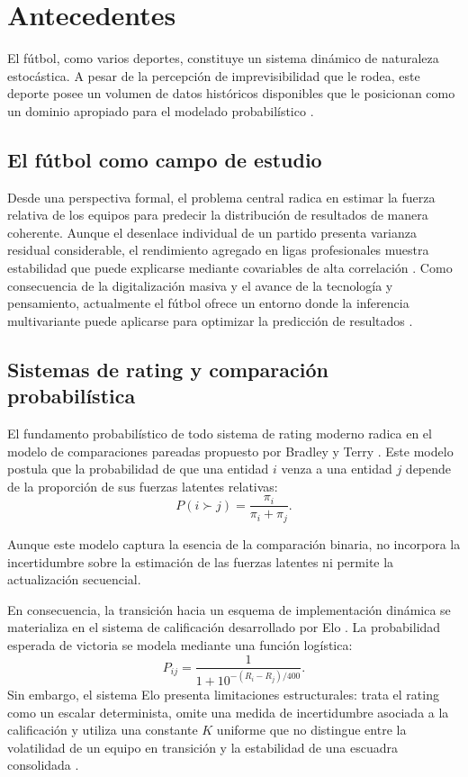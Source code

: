 \chapter{Antecedentes}
\label{ch:antecedentes}

El f\'utbol, como varios deportes, constituye un sistema din\'amico de naturaleza estoc\'astica. A pesar de la percepci\'on de imprevisibilidad que le rodea, este deporte posee un volumen de datos hist\'oricos disponibles que le posicionan como un dominio apropiado para el modelado probabil\'istico \cite{Fonseca}.

\section{El f\'utbol como campo de estudio}

Desde una perspectiva formal, el problema central radica en estimar la fuerza relativa de los equipos para predecir la distribuci\'on de resultados de manera coherente. Aunque el desenlace individual de un partido presenta varianza residual considerable, el rendimiento agregado en ligas profesionales muestra estabilidad que puede explicarse mediante covariables de alta correlaci\'on \cite{SZYMAN1}. Como consecuencia de la digitalizaci\'on masiva y el avance de la tecnolog\'ia y pensamiento, actualmente el f\'utbol ofrece un entorno donde la inferencia multivariante puede aplicarse para optimizar la predicci\'on de resultados \cite{VanPutten2023}.

\section{Sistemas de rating y comparaci\'on probabil\'istica}
\label{sec:sistemas_rating}

El fundamento probabil\'istico de todo sistema de rating moderno radica en el modelo de comparaciones pareadas propuesto por Bradley y Terry \cite{bradley1952}. Este modelo postula que la probabilidad de que una entidad \(i\) venza a una entidad \(j\) depende de la proporci\'on de sus fuerzas latentes relativas:
\[
P(i \succ j) = \frac{\pi_i}{\pi_i + \pi_j}.
\]

Aunque este modelo captura la esencia de la comparaci\'on binaria, no incorpora la incertidumbre sobre la estimaci\'on de las fuerzas latentes ni permite la actualizaci\'on secuencial.

En consecuencia, la transici\'on hacia un esquema de implementaci\'on din\'amica se materializa en el sistema de calificaci\'on desarrollado por Elo \cite{Elo1978}. La probabilidad esperada de victoria se modela mediante una funci\'on log\'istica:
\[
P_{ij} = \frac{1}{1 + 10^{-(R_i - R_j)/400}}.
\]
Sin embargo, el sistema Elo presenta limitaciones estructurales: trata el rating como un escalar determinista, omite una medida de incertidumbre asociada a la calificaci\'on y utiliza una constante \(K\) uniforme que no distingue entre la volatilidad de un equipo en transici\'on y la estabilidad de una escuadra consolidada \cite{Glickman1995}. 

